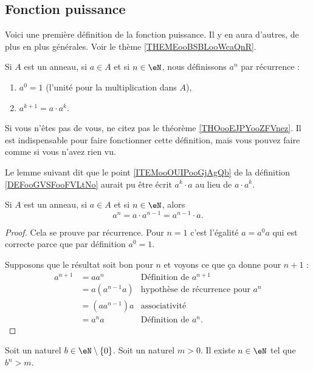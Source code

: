 \subsection{Fonction puissance}

Voici une première définition de la fonction puissance. Il y en aura d'autres, de plus en plus générales. Voir le thème \ref{THEMEooBSBLooWcaQnR}.
\begin{definition}\label{DEFooGVSFooFVLtNo}
	Si \( A\) est un anneau, si \( a\in A\) et si \( n\in \eN\), nous définissons \( a^n\) par récurrence :
	\begin{enumerate}
		\item
		      \( a^0=1\) (l'unité pour la multiplication dans \( A\)),
		\item       \label{ITEMooOUIPooGjAgQb}
		      \( a^{k+1}=a\cdot a^{k}\).
	\end{enumerate}
	Si vous n'êtes pas  de vous, ne citez pas le théorème \ref{THOooEJPYooZFVnez}. Il est indispensable pour faire fonctionner cette définition, mais vous pouvez faire comme si vous n'avez rien vu.
\end{definition}

Le lemme suivant dit que le point \ref{ITEMooOUIPooGjAgQb} de la définition \ref{DEFooGVSFooFVLtNo} aurait pu être écrit \( a^k\cdot a\) au lieu de \( a\cdot a^k\).
\begin{lemma}        \label{LEMooWPARooYLZlzr}
	Si \( A\) est un anneau, si \( a\in A\) et si \( n\in \eN\), alors
	\begin{equation}
		a^n=a\cdot a^{n-1}=a^{n-1}\cdot a.
	\end{equation}
\end{lemma}

\begin{proof}
	Cela se prouve par récurrence. Pour \( n=1\) c'est l'égalité \( a=a^0a\) qui est correcte parce que par définition \( a^0=1\).

	Supposons que le résultat soit bon pour \( n\) et voyons ce que ça donne pour \( n+1\) :
	\begin{subequations}
		\begin{align}
			a^{n+1} & =aa^n        & \text{Définition de } a^{n+1}            \\
			        & =a(a^{n-1}a) & \text{hypothèse de récurrence pour } a^n \\
			        & =(aa^{n-1})a & \text{associativité}                     \\
			        & =a^na        & \text{Définition de } a^n.
		\end{align}
	\end{subequations}
\end{proof}

\begin{proposition}	\label{PROPooPLLSooUpiLKa}
	Soit un naturel \( b\in\eN\setminus\{ 0 \}\). Soit un naturel \( m>0\). Il existe \( n\in \eN\) tel que \( b^n>m\).
\end{proposition}
